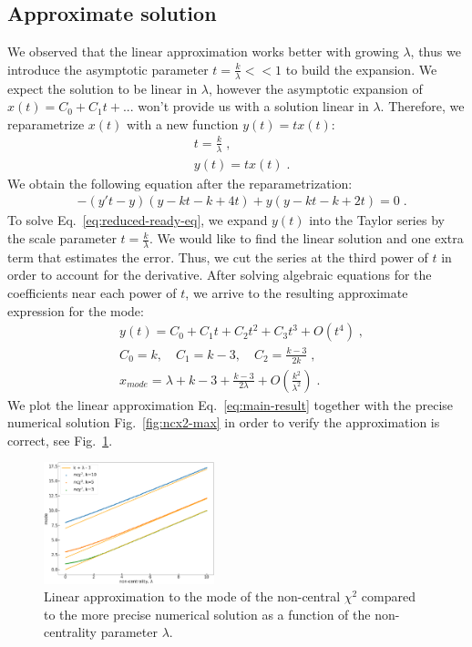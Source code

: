 \documentclass[final,5p,twocolumn,times,authoryear]{elsarticle}
\begin{document}
\subsection{Approximate solution}
We observed that the linear approximation works better with growing $\lambda$, thus we introduce the asymptotic parameter $t = \frac{k}{\lambda} << 1$ to build the expansion. We expect the solution to be linear in $\lambda$, however the asymptotic expansion of $x(t) = C_0 + C_1 t + ...$ won't provide us with a solution linear in $\lambda$. Therefore, we reparametrize $x(t)$ with a new function $y(t) = t x(t)$:
%
\begin{align}
    &t = \frac{k}{\lambda}\;,\label{eq:asymp-scale} \\
    &y(t) = t x(t)\;.
\end{align}
%
We obtain the following equation after the reparametrization:
%
\begin{align}
   &-(y' t - y) (y - kt - k + 4t) + y (y - kt - k + 2t) = 0\label{eq:reduced-ready-eq}\;.
\end{align}
%
To solve Eq.~\ref{eq:reduced-ready-eq}, we expand $y(t)$ into the Taylor series by the scale parameter $t = \frac{k}{\lambda}$. We would like to find the linear solution and one extra term that estimates the error. Thus, we cut the series at the third power of $t$ in order to account for the derivative. After solving algebraic equations for the coefficients near each power of $t$, we arrive to the resulting approximate expression for the mode:
%
\begin{align}
    &y(t) = C_0 + C_1 t + C_2 t^2 + C_3 t^3 + O(t^4)\;, \\
    &C_0 = k, \quad C_1 = k-3, \quad C_2 = \frac{k-3}{2k}\;,\label{eq:taylor-coef-sols}\\
    &\boxed{x_{mode} = \lambda + k - 3 + \frac{k-3}{2 \lambda} + O\left(\frac{k^2}{\lambda^2}\right)} \label{eq:main-result}\;.
\end{align}
%
We plot the linear approximation Eq.~\ref{eq:main-result} together with the precise numerical solution Fig.~\ref{fig:ncx2-max} in order to verify the approximation is correct, see Fig.~\ref{fig:ncx2-vs-approx}.

\begin{figure}[h]
	\centering
 	\includegraphics[width=0.44\textwidth]{ncx2-vs-approx.png}
	\caption{Linear approximation to the mode of the non-central $\chi^2$ compared to the more precise numerical solution as a function of the non-centrality parameter $\lambda$.}\label{fig:ncx2-vs-approx}
\end{figure}
\end{document}
